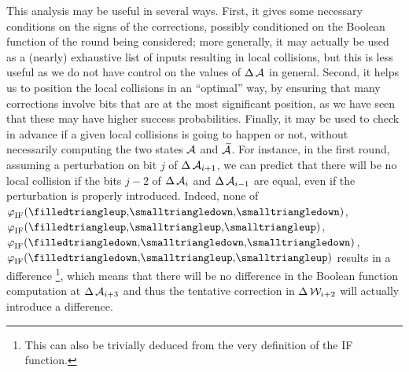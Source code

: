 This analysis may be useful in several ways. First, it gives some necessary conditions on the signs of the corrections, possibly conditioned on the Boolean function of the round being considered;
more generally, it may actually be used as a (nearly) exhaustive list of inputs resulting in local collisions, but this is less useful as we do not have control on the values of $\operatorname{\Delta}\mathcal{A}$ in general. Second,
it helps us to position the local collisions in an ``optimal'' way, by ensuring that many corrections involve bits that are at the most significant position, as we have seen that these may
have higher success probabilities. Finally, it
may be used to check in advance if a given local collisions is going to happen or not, without necessarily computing the two states $\mathcal{A}$ and $\mathcal{\widetilde A}$. For instance, in the first round,
assuming a perturbation on bit $j$ of $\operatorname{\Delta}\mathcal{A}_{i+1}$, we can predict that there will be no local collision if the bits $j - 2$ of $\operatorname{\Delta}\mathcal{A}_{i}$ and $\operatorname{\Delta}\mathcal{A}_{i-1}$ are equal, even if the perturbation is properly
introduced. Indeed, none of $\fif(\text{\onediffu,\nodiffz,\nodiffz})$, $\fif(\text{\onediffu,\nodiffo,\nodiffo})$, $\fif(\text{\onediffd,\nodiffz,\nodiffz})$, $\fif(\text{\onediffd,\nodiffo,\nodiffo})$
results in a difference
\footnote{This can also be trivially deduced from the very definition of the IF function.}, which means that there will be no difference in the Boolean function computation at $\operatorname{\Delta}\mathcal{A}_{i+3}$ and thus the tentative correction
in $\operatorname{\Delta}\mathcal{W}_{i+2}$ will actually introduce a difference.

